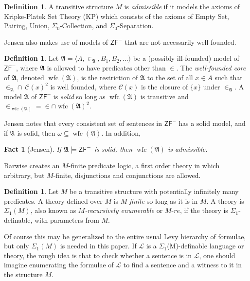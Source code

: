 \documentclass{amsart}
\newtheorem{fact}[theorem]{Fact}
\theoremstyle{definition}
\newtheorem{definition}[theorem]{Definition}
\theoremstyle{remark}
\DeclareMathOperator{\wfc}{wfc}
\begin{document}
\begin{definition} A transitive structure $M$ is \emph{admissible} if it models the axioms of \textsf{Kripke-Platek Set Theory} (\textsf{KP}) which consists of the axioms of \textsf{Empty Set}, \textsf{Pairing}, \textsf{Union}, $\Sigma_0$-\textsf{Collection}, and $\Sigma_0$-\textsf{Separation}. \end{definition}

Jensen also makes use of models of $\textsf{ZF}^-$ that are not necessarily well-founded.
\begin{definition} Let $\mathfrak A = \langle A, \in_{\mathfrak A}, B_1, B_2, \dots \rangle$ be a (possibly ill-founded) model  of $\textsf{ZF}^-$, where $\mathfrak A$ is allowed to have predicates other than $\in$. The \emph{well-founded core} of $\mathfrak A$, denoted $\wfc(\mathfrak A)$, is the restriction of $\mathfrak A$ to the set of all $x \in A$ such that $\in_{\mathfrak A} \cap \ \mathcal C(x)^2$ is well founded, where $\mathcal C(x)$ is the closure of $\{x\}$ under $\in_{\mathfrak A}$. A model $\mathfrak A$ of $\textsf{ZF}^-$ is \emph{solid} so long as $\wfc(\mathfrak A)$ is transitive and $\in_{\wfc(\mathfrak A)}=\in \cap \wfc(\mathfrak A)^2$. \end{definition}

Jensen \cite[Section 1.2]{Jensen:2012fr} notes that every consistent set of sentences in $\textsf{ZF}^-$ has a solid model, and if $\mathfrak A$ is solid, then $\omega \subseteq \wfc(\mathfrak A)$. In addition,

\begin{fact}[Jensen] If $\mathfrak A \models \textsf{\textup{ZF}}^-$ is solid, then $\wfc(\mathfrak A)$ is admissible. \end{fact}

Barwise creates an $M$-finite predicate logic, a first order theory in which arbitrary, but $M$-finite, disjunctions and conjunctions are allowed.
\begin{definition} Let $M$ be a transitive structure with potentially infinitely many predicates. A theory defined over $M$ is $M$-\emph{finite} so long as it is in $M$. A theory is $\Sigma_1(M)$, also known as \emph{$M$-recursively enumerable} or $M$-$re$, if the theory is $\Sigma_1$-definable, with parameters from $M$. \end{definition}
Of course this may be generalized to the entire usual Levy hierarchy of formulae, but only $\Sigma_1(M)$ is needed in this paper. If $\mathcal L$ is a $\Sigma_1$(M)-definable language or theory, the rough idea is that to check whether a sentence is in $\mathcal L$, one should imagine enumerating the formulae of $\mathcal L$ to find a sentence and a witness to it in the structure $M$.
\end{document}
